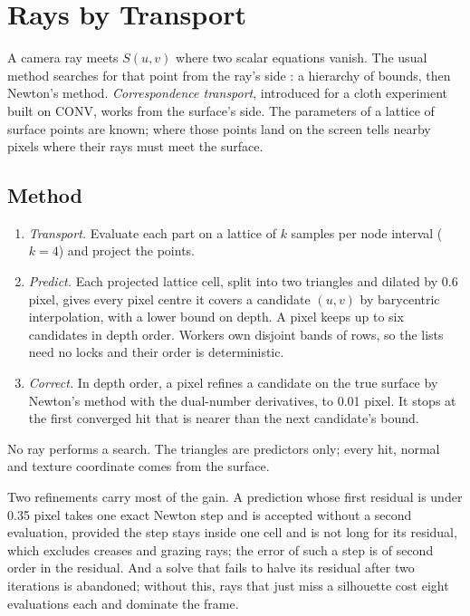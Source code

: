 \documentclass[journal]{IEEEtran}
\begin{document}
\section{Rays by Transport}
\label{sec:transport}

A camera ray meets $S(u,v)$ where two scalar equations vanish. The usual
method searches for that point from the ray's side
\cite{kajiya1982,toth1985}: a hierarchy of bounds, then Newton's method.
\emph{Correspondence transport}, introduced for a cloth experiment built
on CONV, works from the surface's side. The parameters of a lattice of
surface points are known; where those points land on the screen tells
nearby pixels where their rays must meet the surface.

\subsection{Method}

\begin{enumerate}
\item \emph{Transport.} Evaluate each part on a lattice of $k$ samples per
node interval ($k=4$) and project the points.
\item \emph{Predict.} Each projected lattice cell, split into two
triangles and dilated by 0.6 pixel, gives every pixel centre it covers a
candidate $(u,v)$ by barycentric interpolation, with a lower bound on
depth. A pixel keeps up to six candidates in depth order. Workers own
disjoint bands of rows, so the lists need no locks and their order is
deterministic.
\item \emph{Correct.} In depth order, a pixel refines a candidate on the
true surface by Newton's method with the dual-number derivatives, to
0.01 pixel. It stops at the first converged hit that is nearer than the
next candidate's bound.
\end{enumerate}
No ray performs a search. The triangles are predictors only; every hit,
normal and texture coordinate comes from the surface.

Two refinements carry most of the gain. A prediction whose first residual
is under 0.35 pixel takes one exact Newton step and is accepted without a
second evaluation, provided the step stays inside one cell and is not
long for its residual, which excludes creases and grazing rays; the
error of such a step is of second order in the residual. And a solve that
fails to halve its residual after two iterations is abandoned; without
this, rays that just miss a silhouette cost eight evaluations each and
dominate the frame.
\end{document}
